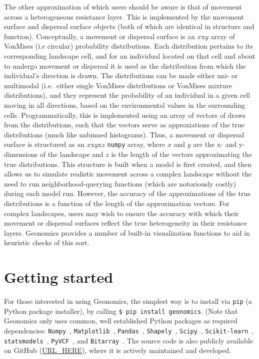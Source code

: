 ﻿\documentclass{article}
\begin{document}
The other approximation of which users should be aware
is that of movement across a heterogeneous resistance layer.
This is implemented by the movement surface and dispersal surface objects
(both of which are identical in structure and function).
Conceptually, a movement or dispersal surface is an $x$x$y$ array of VonMises (i.e circular)
probability distributions. Each distribution pertains to its corresponding landscape cell,
and for an individual located on that cell and about to undergo movement or dispersal
it is used as the distribution from which the individual's direction is drawn.
The distributions can be made either uni- or multimodal (i.e.\ either single VonMises distributions
or VonMises mixture distributions), and they represent the probability of an individual in a given
cell moving in all directions, based on the environmental values in the surrounding cells.
Programmatically, this is implemented using an array of vectors of draws from the distributions,
such that the vectors serve as approxiations of the true distributions (much like unbinned histograms).
Thus, a movement or dispersal surface is structured as an $x$x$y$x$z$ \texttt{numpy} array,
where $x$ and $y$ are the x- and y-dimensions of the landscape and $z$ is the length of the
vectors approximating the true distributions.
This structure is built when a model is first created, and then allows us to simulate realistic
movement across a complex landscape without the need to run neighborhood-querying functions
(which are notoriously costly) during each model run.
However, the accuracy of the approximations of the true distributions is a function of
the length of the approximation vectors.
For complex landscapes, users may wish to ensure the accuracy with which their movement or
dispersal surfaces reflect the true heterogeneity in their resistance layers.
Geonomics provides a number of built-in visualization functions to aid in heuristic checks of this sort.


\section{Getting started}
For those interested in using Geonomics, the simplest way is to install
via \texttt{pip} (a Python package installer),
by calling \texttt{\$ pip install geonomics}.
(Note that Geonomics only uses common, well established Python packages
as required dependencies:
\texttt{Numpy}~\cite{numpy},
\texttt{Matplotlib}~\cite{matplotlib},
\texttt{Pandas}~\cite{pandas},
\texttt{Shapely}~\cite{shapely},
\texttt{Scipy}~\cite{scipy},
\texttt{Scikit-learn}~\cite{scikit-learn},
\texttt{statsmodels}~\cite{statsmodels},
\texttt{PyVCF}~\cite{pyvcf},
and \texttt{Bitarray}~\cite{bitarray}.
The source code is also publicly available on GitHub (\url{URL\_HERE}),
where it is actively maintained and developed.
\end{document}
